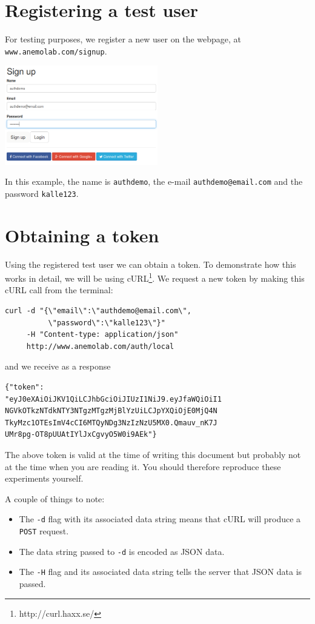 \documentclass{article}
\begin{document}
\section{Registering a test user}
For testing purposes, we register a new user on the webpage, at \texttt{www.anemolab.com/signup}.
\begin{center}
\includegraphics[width=0.5\textwidth]{signup.png}
\end{center}

In this example, the name is \texttt{authdemo}, the e-mail \texttt{authdemo@email.com} and the password \texttt{kalle123}.
\section{Obtaining a token}
Using the registered test user we can obtain a token. To demonstrate how this works in detail, we will be using cURL\footnote{http://curl.haxx.se/}. We request a new token by making this cURL call from the terminal:
\begin{verbatim}
curl -d "{\"email\":\"authdemo@email.com\",
          \"password\":\"kalle123\"}" 
     -H "Content-type: application/json" 
     http://www.anemolab.com/auth/local
\end{verbatim}
and we receive as a response
\begin{verbatim}
{"token":
"eyJ0eXAiOiJKV1QiLCJhbGciOiJIUzI1NiJ9.eyJfaWQiOiI1
NGVkOTkzNTdkNTY3NTgzMTgzMjBlYzUiLCJpYXQiOjE0MjQ4N
TkyMzc1OTEsImV4cCI6MTQyNDg3NzIzNzU5MX0.Qmauv_nK7J
UMr8pg-OT8pUUAtIYlJxCgvyO5W0i9AEk"}
\end{verbatim}
The above token is valid at the time of writing this document but probably not at the time when you are reading it. You should therefore reproduce these experiments yourself.

A couple of things to note:
\begin{itemize}
\item The \texttt{-d} flag with its associated data string means that cURL will produce a \texttt{POST} request.
\item The data string passed to \texttt{-d} is encoded as JSON data.
\item The \texttt{-H} flag and its associated data string tells the server that JSON data is passed.
\end{itemize}
\end{document}
